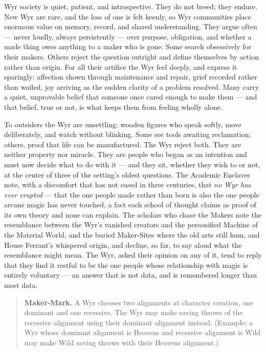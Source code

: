 Wyr society is quiet, patient, and introspective. They do not breed; they endure. New Wyr are rare, and the loss of one is felt keenly, so Wyr communities place enormous value on memory, record, and shared understanding. They argue often --- never loudly, always persistently --- over purpose, obligation, and whether a made thing owes anything to a maker who is gone. Some search obsessively for their makers. Others reject the question outright and define themselves by action rather than origin. For all their artifice the Wyr feel deeply, and express it sparingly: affection shown through maintenance and repair, grief recorded rather than wailed, joy arriving as the sudden clarity of a problem resolved. Many carry a quiet, unprovable belief that someone once cared enough to make them --- and that belief, true or not, is what keeps them from feeling wholly alone.

To outsiders the Wyr are unsettling: wooden figures who speak softly, move deliberately, and watch without blinking. Some see tools awaiting reclamation; others, proof that life can be manufactured. The Wyr reject both. They are neither property nor miracle. They are people who began as an intention and must now decide what to do with it --- and they sit, whether they wish to or not, at the center of three of the setting's oldest questions. The Academic Enclaves note, with a discomfort that has not eased in three centuries, that \textit{no Wyr has ever erupted} --- that the one people made rather than born is also the one people arcane magic has never touched, a fact each school of thought claims as proof of its own theory and none can explain. The scholars who chase the Makers note the resemblance between the Wyr's vanished creators and the personified Machine of the Material World, and the buried Maker-Sites where the old arts still hum, and House Ferrant's whispered origin, and decline, so far, to say aloud what the resemblance might mean. The Wyr, asked their opinion on any of it, tend to reply that they find it restful to be the one people whose relationship with magic is entirely voluntary --- an answer that is not data, and is remembered longer than most data.

\begin{quote}
\textbf{Maker-Mark.} A Wyr chooses two alignments at character creation, one dominant and one recessive. The Wyr may make saving throws of the recessive alignment using their dominant alignment instead. (Example: a Wyr whose dominant alignment is Heavens and recessive alignment is Wild may make Wild saving throws with their Heavens alignment.)
\end{quote}

